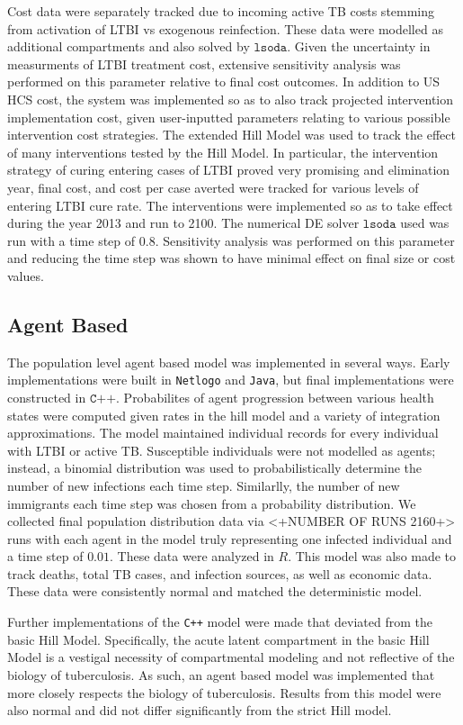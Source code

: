 \documentclass{amsart}
\begin{document}
Cost data were separately tracked due to incoming active TB costs stemming from
activation of LTBI vs exogenous reinfection. These data were modelled as
additional compartments and also solved by $\texttt{lsoda}$.  Given the
uncertainty in measurments of LTBI treatment cost, extensive sensitivity
analysis was performed on this parameter relative to final cost outcomes. In
addition to US HCS cost, the system was implemented so as to also track
projected intervention implementation cost, given user-inputted parameters
relating to various possible intervention cost strategies. The extended Hill
Model was used to track the effect of many interventions tested by the Hill
Model. In particular, the intervention strategy of curing entering cases of LTBI
proved very promising and elimination year, final cost, and cost per case
averted were tracked for various levels of entering LTBI cure rate. The
interventions were implemented so as to take effect during the year 2013 and run
to 2100. The numerical DE solver $\texttt{lsoda}$ used was run with a time step
of $0.8$. Sensitivity analysis was performed on this parameter and reducing the
time step was shown to have minimal effect on final size or cost values.

\subsection{Agent Based}
The population level agent based model was implemented in several ways. Early
implementations were built in \texttt{Netlogo} and \texttt{Java}, but final
implementations were constructed in $\texttt{C++}$. Probabilites of agent
progression between various health states were computed given rates in the hill
model and a variety of integration approximations. The model maintained
individual records for every individual with LTBI or active TB. Susceptible
individuals were not modelled as agents; instead, a binomial distribution was used to
probabilistically determine the number of new infections each time step.
Similarlly, the number of new immigrants each time step was chosen from a
probability distribution. We collected final population distribution data via
<+NUMBER OF RUNS 2160+> runs with each agent in the model truly representing one
infected individual and a time step of $0.01$.  These data were analyzed in $R$.
This model was also made to track deaths, total TB cases, and infection sources,
as well as economic data. These data were consistently normal and matched the
deterministic model. 

Further implementations of the \texttt{C++} model were made that deviated from
the basic Hill Model. Specifically, the acute latent compartment in the basic
Hill Model is a vestigal necessity of compartmental modeling and not reflective
of the biology of tuberculosis. As such, an agent based model was implemented
that more closely respects the biology of tuberculosis. Results from this model
were also normal and did not differ significantly from the strict Hill model. 
\end{document}
